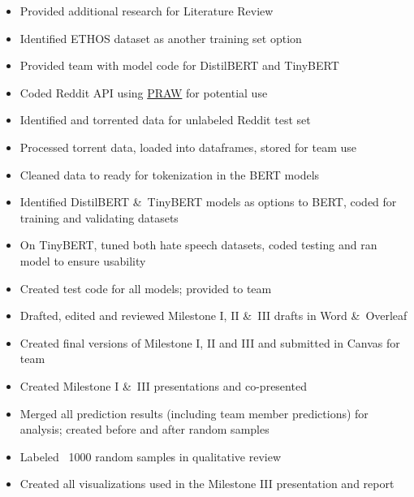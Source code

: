\documentclass[conference]{IEEEtran}
\begin{document}
\begin{itemize}
   \item Provided additional research for Literature Review
   \item Identified ETHOS dataset as another training set option
   \item Provided team with model code for DistilBERT and TinyBERT 
   \item Coded Reddit API using \href{https://praw.readthedocs.io/en/stable/}{PRAW} for potential use  
   \item Identified and torrented data for unlabeled Reddit test set
   \item Processed torrent data, loaded into dataframes, stored for team use
   \item Cleaned data to ready for tokenization in the BERT models
   \item Identified DistilBERT \&\ TinyBERT models as options to BERT, coded for training and validating datasets 
   \item On TinyBERT, tuned both hate speech datasets, coded testing and ran model to ensure usability
   \item Created test code for all models; provided to team
   \item Drafted, edited and reviewed Milestone I, II \&\ III drafts in Word \&\ Overleaf 
   \item Created final versions of Milestone I, II and III and submitted in Canvas for team 
   \item Created Milestone I \&\ III presentations and co-presented  
   \item Merged all prediction results (including team member predictions) for analysis; created before and after random samples
   \item Labeled ~1000 random samples in qualitative review
   \item Created all visualizations used in the Milestone III presentation and report
 \end{itemize}
\end{document}

